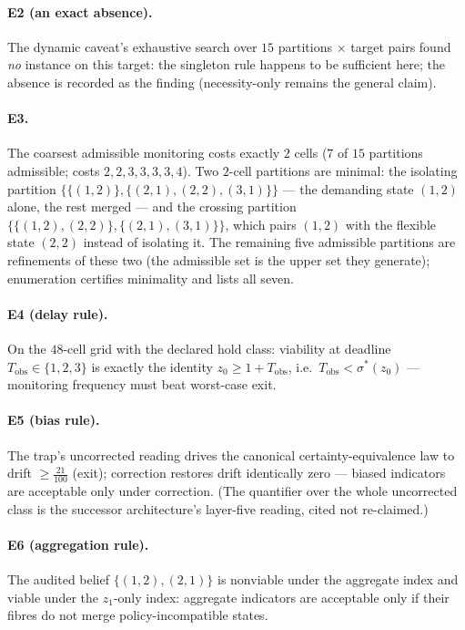 \documentclass[10pt,twocolumn]{article}
\theoremstyle{definition}
\begin{document}
\paragraph{E2 (an exact absence).} The dynamic caveat's exhaustive search
over $15$ partitions $\times$ target pairs found \emph{no} instance on
this target: the singleton rule happens to be sufficient here; the absence
is recorded as the finding (necessity-only remains the general claim).

\paragraph{E3.} The coarsest admissible monitoring costs exactly $2$ cells
($7$ of $15$ partitions admissible; costs $2,2,3,3,3,3,4$). Two $2$-cell
partitions are minimal: the isolating partition
$\{\{(1,2)\},\{(2,1),(2,2),(3,1)\}\}$ --- the demanding state $(1,2)$
alone, the rest merged --- and the crossing partition
$\{\{(1,2),(2,2)\},\{(2,1),(3,1)\}\}$, which pairs $(1,2)$ with the
flexible state $(2,2)$ instead of isolating it. The remaining five
admissible partitions are refinements of these two (the admissible set is
the upper set they generate); enumeration certifies minimality and lists
all seven.

\paragraph{E4 (delay rule).} On the $48$-cell grid with the declared hold
class: viability at deadline $T_{\mathrm{obs}}\in\{1,2,3\}$ is exactly the
identity $z_0\ge1+T_{\mathrm{obs}}$, i.e.\ $T_{\mathrm{obs}}<\sigma^\ast
(z_0)$ --- monitoring frequency must beat worst-case exit.

\paragraph{E5 (bias rule).} The trap's uncorrected reading drives the
canonical certainty-equivalence law to drift $\ge\tfrac{21}{100}$ (exit);
correction restores drift identically zero --- biased indicators are
acceptable only under correction. (The quantifier over the whole uncorrected
class is the successor architecture's layer-five reading, cited not
re-claimed.)

\paragraph{E6 (aggregation rule).} The audited belief
$\{(1,2),(2,1)\}$ is nonviable under the aggregate index and viable under
the $z_1$-only index: aggregate indicators are acceptable only if their
fibres do not merge policy-incompatible states.
\end{document}

